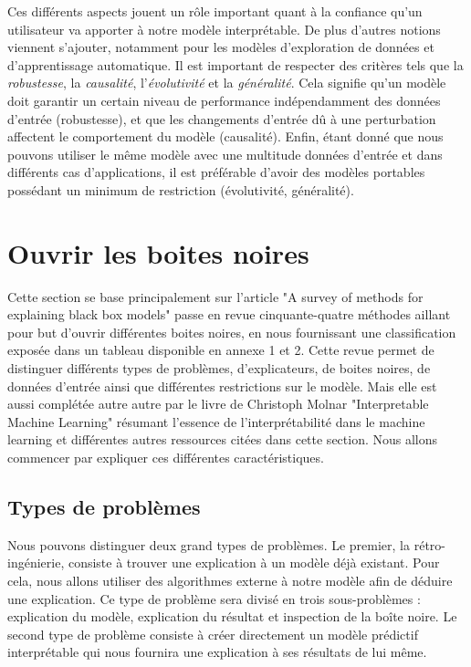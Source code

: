 Ces différents aspects jouent un rôle important quant à la confiance qu'un utilisateur va apporter à notre modèle interprétable. De plus d'autres notions viennent s'ajouter, notamment pour les modèles d'exploration de données et d'apprentissage automatique. Il est important de respecter des critères tels que la \textit{robustesse}, la \textit{causalité}, l'\textit{évolutivité} et la \textit{généralité}. Cela signifie qu'un modèle doit garantir un certain niveau de performance indépendamment des données d'entrée (robustesse), et que les changements d'entrée dû à une perturbation affectent le comportement du modèle (causalité). Enfin, étant donné que nous pouvons utiliser le même modèle avec une multitude données d'entrée et dans différents cas d'applications, il est préférable d'avoir des modèles portables possédant un minimum de restriction (évolutivité, généralité).

\section{Ouvrir les boites noires}
Cette section se base principalement sur l'article "A survey of methods for explaining black box models"\cite{surveyExplaining} passe en revue cinquante-quatre méthodes aillant pour but d'ouvrir différentes boites noires, en nous fournissant une classification exposée dans un tableau disponible en annexe 1 et 2. Cette revue permet de distinguer différents types de problèmes, d'explicateurs, de boites noires, de données d'entrée ainsi que différentes restrictions sur le modèle. Mais elle est aussi complétée autre autre par le livre de Christoph Molnar "Interpretable Machine Learning" \cite{molnar2019} résumant l'essence de l'interprétabilité dans le machine learning et différentes autres ressources citées dans cette section. Nous allons commencer par expliquer ces différentes caractéristiques.

\subsection{Types de problèmes}
Nous pouvons distinguer deux grand types de problèmes. Le premier, la rétro-ingénierie, consiste à trouver une explication à un modèle déjà existant. Pour cela, nous allons utiliser des algorithmes externe à notre modèle afin de déduire une explication. Ce type de problème sera divisé en trois sous-problèmes : explication du modèle, explication du résultat et inspection de la boîte noire. Le second type de problème consiste à créer directement un modèle prédictif interprétable qui nous fournira une explication à ses résultats de lui même.
